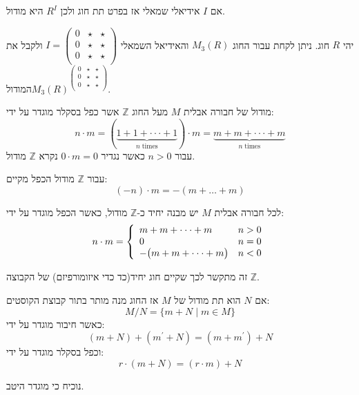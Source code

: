 \documentclass{tstextbook}
\begin{document}
\begin{proposition}
אם \(I\) אידיאלי שמאלי אז בפרט תת חוג ולכן \(R^{I}\) היא מודול.

\end{proposition}
\begin{example}
יהי \(R\) חוג. ניתן לקחת עבור החוג \(M_{3}(R)\) והאידיאל השמאלי \(I=\begin{pmatrix}0& \star &\star\\0& \star &\star\\0& \star &\star\\\end{pmatrix}\) ולקבל את המודול\(M_{3}(R)^{\begin{pmatrix}0& \star &\star\\0& \star &\star\\0& \star &\star\\\end{pmatrix}}\). 

\end{example}
\begin{definition}
מודול של חבורה אבלית \(M\) מעל החוג \(\mathbb{Z}\) אשר כפל בסקלר מוגדר על ידי:
$$n\cdot m=(\underbrace{1+1+\cdot\cdot\cdot+1}_{n\;\mathrm{times}})\cdot m=\underbrace{m+m+\cdot\cdot\cdot+m}_{n\;\mathrm{times}}$$
עבור \(n> 0\) כאשר נגדיר \(0\cdot m = 0\) נקרא \(\mathbb{Z}\) מודול.

\end{definition}
\begin{proposition}
עבור \(\mathbb{Z}\) מודול הכפל מקיים:
$$(-n)\cdot m=-(m+\dots+m)$$

\end{proposition}
\begin{corollary}
לכל חבורה אבלית \(M\) יש מבנה יחיד כ-\(\mathbb{Z}\) מודול, כאשר הכפל מוגדר על ידי:
$$n\cdot m={\left\{\begin{array}{l l}{m+m+\cdot\cdot\cdot+m}&{n>0}\\ {0}&{n=0}\\ {-{\big(}m+m+\cdot\cdot\cdot+m{\big)}}&{n<0}\end{array}\right.}$$

\end{corollary}
\begin{remark}
זה מתקשר לכך שקיים חוג יחיד(כד כדי איזומורפיזם) של הקבוצה \(\mathbb{Z}\).

\end{remark}
\begin{definition}
אם \(N\) הוא תת מודול של \(M\) אז החוג מנה מותר בתור קבוצת הקוסטים:
$$M/N=\{m+N\mid m\in M\}$$
כאשר חיבור מוגדר על ידי:
$$(m+N)+(m^{\prime}+N)=(m+m^{\prime})+N$$
וכפל בסקלר מוגדר על ידי:
$$r\cdot(m+N)=(r\cdot m)+N$$

\end{definition}
נוכיח כי מוגדר היטב.
\end{document}
